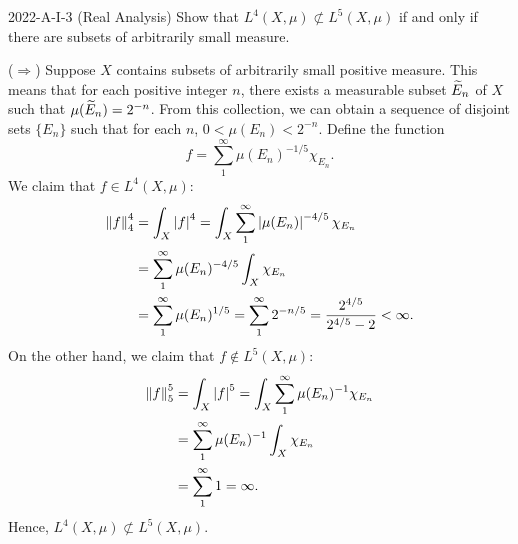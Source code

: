 \documentclass{article}
\begin{document}
\begin{prb}{2022-A-I-3 (Real Analysis)}
	Show that $L^{4}(X, \mu) \not\subset L^{5}(X, \mu)$ if and only if there are subsets of arbitrarily small measure. 
\end{prb}
\begin{solutions}
	($\Rightarrow$) Suppose $X$ contains subsets of arbitrarily small positive measure. This means that for each positive integer $n$, there exists a measurable subset $\widetilde{E}_{n}$ of $X$ such that $\mu(\widetilde{E}_{n}) = 2^{-n}$. From this collection, we can obtain a sequence of disjoint sets $\{E_{n}\}$ such that for each $n$, $0 < \mu(E_{n}) < 2^{-n}$. Define the function 
		\begin{equation}
			f = \sum_{1}^{\infty}\mu(E_{n})^{-1/5}\chi_{E_{n}}. 
		\end{equation}
	We claim that $f \in L^{4}(X, \mu)$: 
		\begin{align}
			\begin{split}
				\left\Vert f \right\Vert_{4}^{4} &= \int_{X}\left| f \right|^{4} = \int_{X}\sum_{1}^{\infty}\left| \mu(E_{n}) \right|^{-4/5}\chi_{E_{n}} \\
				&= \sum_{1}^{\infty}\mu(E_{n})^{-4/5}\int_{X}\chi_{E_{n}} \\
				&= \sum_{1}^{\infty}\mu(E_{n})^{1/5} = \sum_{1}^{\infty}2^{-n/5} = \frac{2^{4/5}}{2^{4/5} - 2} < \infty. 
			\end{split}
		\end{align}
	On the other hand, we claim that $f \notin L^{5}(X, \mu)$: 
		\begin{align}
			\begin{split}
				\left\Vert f \right\Vert_{5}^{5} &= \int_{X}\left| f \right|^{5} = \int_{X}\sum_{1}^{\infty}\mu(E_{n})^{-1}\chi_{E_{n}} \\
				&= \sum_{1}^{\infty}\mu(E_{n})^{-1}\int_{X}\chi_{E_{n}} \\
				&= \sum_{1}^{\infty}1 = \infty. 
			\end{split}
		\end{align}
	Hence, $L^{4}(X, \mu) \not\subset L^{5}(X, \mu)$. 
	

\end{solutions}
\end{document}
